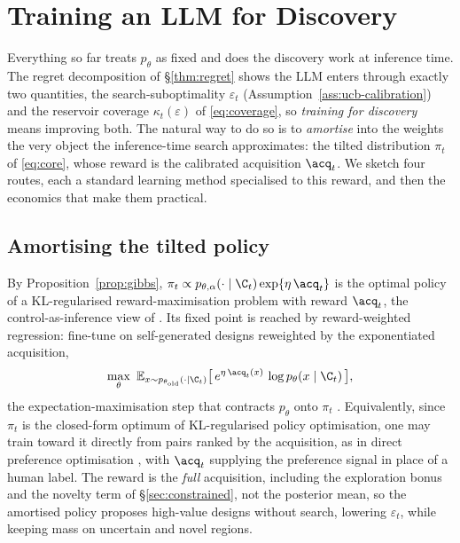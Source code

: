 \section{Training an LLM for Discovery}
\label{sec:training}

Everything so far treats $p_\theta$ as fixed and does the discovery work at inference time. The regret
decomposition of \S\ref{thm:regret} shows the LLM enters through exactly two quantities, the
search-suboptimality $\varepsilon_t$ (Assumption~\ref{ass:ucb-calibration}) and the reservoir coverage
$\kappa_t(\varepsilon)$ of \eqref{eq:coverage}, so \emph{training for discovery} means improving both. The
natural way to do so is to \emph{amortise} into the weights the very object the inference-time search
approximates: the tilted distribution $\pi_t$ of \eqref{eq:core}, whose reward is the calibrated acquisition
$\acq_t$. We sketch four routes, each a standard learning method specialised to this reward, and then the
economics that make them practical.

\subsection{Amortising the tilted policy}
\label{sec:amortise}
By Proposition~\ref{prop:gibbs}, $\pi_t\propto p_{\theta,\alpha}(\cdot\mid\C_t)\exp\{\eta\,\acq_t\}$ is the
optimal policy of a KL-regularised reward-maximisation problem with reward $\acq_t$, the control-as-inference
view of \citet{levine2018reinforcement}. Its fixed point is reached by reward-weighted regression: fine-tune on
self-generated designs reweighted by the exponentiated acquisition,
\begin{equation}
\label{eq:amortize}
\max_{\theta}\ \mathbb{E}_{x\sim p_{\theta_{\mathrm{old}}}(\cdot\mid\C_t)}\big[\,e^{\eta\,\acq_t(x)}\,\log p_\theta(x\mid\C_t)\,\big],
\end{equation}
the expectation-maximisation step that contracts $p_\theta$ onto $\pi_t$ \citep{peng2019advantage}.
Equivalently, since $\pi_t$ is the closed-form optimum of KL-regularised policy optimisation, one may train
toward it directly from pairs ranked by the acquisition, as in direct preference optimisation
\citep{rafailov2023direct}, with $\acq_t$ supplying the preference signal in place of a human label. The reward
is the \emph{full} acquisition, including the exploration bonus and the novelty term of
\S\ref{sec:constrained}, not the posterior mean, so the amortised policy proposes high-value designs without
search, lowering $\varepsilon_t$, while keeping mass on uncertain and novel regions.

